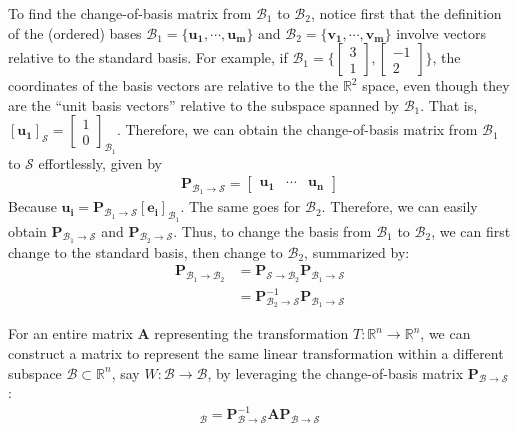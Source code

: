 To find the change-of-basis matrix from $\mathcal{B}_1$ to $\mathcal{B}_2$, notice first that the definition of the (ordered) bases $\mathcal{B}_1=\{\bm{u_1},\cdots,\bm{u_m}\}$ and $\mathcal{B}_2=\{\bm{v_1},\cdots,\bm{v_m}\}$ involve vectors relative to the standard basis. For example, if $\mathcal{B}_1=\Big\{\begin{bmatrix}3\\1\end{bmatrix},\begin{bmatrix}-1\\2\end{bmatrix}\Big\}$, the coordinates of the basis vectors are relative to the the $\mathbb{R}^2$ space, even though they are the ``unit basis vectors'' relative to the subspace spanned by $\mathcal{B}_1$. That is, $[\bm{u_1}]_{\mathcal{S}}=\begin{bmatrix}1\\0\end{bmatrix}_{\mathcal{B}_1}$. Therefore, we can obtain the change-of-basis matrix from $\mathcal{B}_1$ to $\mathcal{S}$ effortlessly, given by
  \begin{align}
    \bm{P}_{\mathcal{B}_1\rightarrow\mathcal{S}}=
    \begin{bmatrix}
      \bm{u_1}& \cdots& \bm{u_n}
    \end{bmatrix}
  \end{align}
  Because $\bm{u_i}=\bm{P}_{\mathcal{B}_1\rightarrow\mathcal{S}}[\bm{e_i}]_{\mathcal{B}_1}$. The same goes for $\mathcal{B}_2$. Therefore, we can easily obtain $\bm{P}_{\mathcal{B}_1\rightarrow\mathcal{S}}$ and $\bm{P}_{\mathcal{B}_2\rightarrow\mathcal{S}}$. Thus, to change the basis from $\mathcal{B}_1$ to $\mathcal{B}_2$, we can first change to the standard basis, then change to $\mathcal{B}_2$, summarized by:
  \begin{align}
    \bm{P}_{\mathcal{B}_1\rightarrow\mathcal{B}_2}&=\bm{P}_{\mathcal{S}\rightarrow\mathcal{B}_2}\bm{P}_{\mathcal{B}_1\rightarrow\mathcal{S}}\\
   &= \bm{P}_{\mathcal{B}_2\rightarrow\mathcal{S}}^{-1}\bm{P}_{\mathcal{B}_1\rightarrow\mathcal{S}}
  \end{align}

  For an entire matrix $\bm{A}$ representing the transformation $T:\mathbb{R}^n\rightarrow\mathbb{R}^n$, we can construct a matrix to represent the same linear transformation within a different subspace $\mathcal{B}\subset\mathbb{R}^n$, say $W:\mathcal{B}\rightarrow\mathcal{B}$, by leveraging the change-of-basis matrix $\bm{P}_{\mathcal{B}\rightarrow\mathcal{S}}$:
  \begin{align}
    [\bm{A}]_{\mathcal{B}}=\bm{P}_{\mathcal{B}\rightarrow\mathcal{S}}^{-1}\bm{A}\bm{P}_{\mathcal{B}\rightarrow\mathcal{S}}
  \end{align}
  
